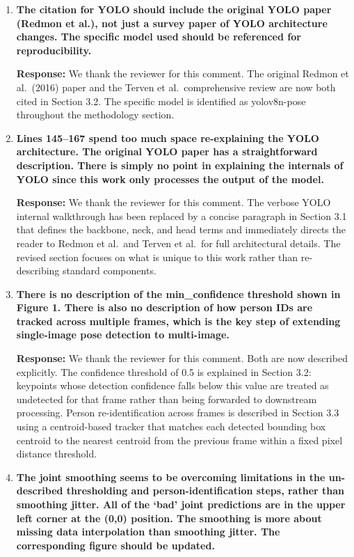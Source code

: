 \begin{enumerate}
    \item \textbf{The citation for YOLO should include the original YOLO paper (Redmon et al.), not just a survey paper of YOLO architecture changes. The specific model used should be referenced for reproducibility.}

    \textbf{Response:} We thank the reviewer for this comment. The original Redmon et al.\ (2016) paper and the Terven et al.\ comprehensive review are now both cited in Section 3.2. The specific model is identified as yolov8n-pose throughout the methodology section.

    \item \textbf{Lines 145--167 spend too much space re-explaining the YOLO architecture. The original YOLO paper has a straightforward description. There is simply no point in explaining the internals of YOLO since this work only processes the output of the model.}

    \textbf{Response:} We thank the reviewer for this comment. The verbose YOLO internal walkthrough has been replaced by a concise paragraph in Section 3.1 that defines the backbone, neck, and head terms and immediately directs the reader to Redmon et al.\ and Terven et al.\ for full architectural details. The revised section focuses on what is unique to this work rather than re-describing standard components.

    \item \textbf{There is no description of the min\_confidence threshold shown in Figure 1. There is also no description of how person IDs are tracked across multiple frames, which is the key step of extending single-image pose detection to multi-image.}

    \textbf{Response:} We thank the reviewer for this comment. Both are now described explicitly. The confidence threshold of 0.5 is explained in Section 3.2: keypoints whose detection confidence falls below this value are treated as undetected for that frame rather than being forwarded to downstream processing. Person re-identification across frames is described in Section 3.3 using a centroid-based tracker that matches each detected bounding box centroid to the nearest centroid from the previous frame within a fixed pixel distance threshold.

    \item \textbf{The joint smoothing seems to be overcoming limitations in the un-described thresholding and person-identification steps, rather than smoothing jitter. All of the `bad' joint predictions are in the upper left corner at the (0,0) position. The smoothing is more about missing data interpolation than smoothing jitter. The corresponding figure should be updated.}


\end{enumerate}
